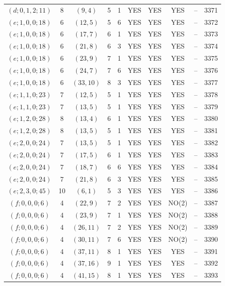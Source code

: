 \begin{longtable}{|c|c|c|c|c|c|c|c|c|c|}
$(d; 0, 1, 2; 11)$ & 8 & $(9, 4)$ & 5 & 1 & YES & YES & YES & -- & 3371\\
$(e; 1, 0, 0; 18)$ & 6 & $(12, 5)$ & 5 & 6 & YES & YES & YES & -- & 3372\\
$(e; 1, 0, 0; 18)$ & 6 & $(17, 7)$ & 6 & 1 & YES & YES & YES & -- & 3373\\
$(e; 1, 0, 0; 18)$ & 6 & $(21, 8)$ & 6 & 3 & YES & YES & YES & -- & 3374\\
$(e; 1, 0, 0; 18)$ & 6 & $(23, 9)$ & 7 & 1 & YES & YES & YES & -- & 3375\\
$(e; 1, 0, 0; 18)$ & 6 & $(24, 7)$ & 7 & 6 & YES & YES & YES & -- & 3376\\
$(e; 1, 0, 0; 18)$ & 6 & $(33, 10)$ & 8 & 3 & YES & YES & YES & -- & 3377\\
$(e; 1, 1, 0; 23)$ & 7 & $(12, 5)$ & 5 & 1 & YES & YES & YES & -- & 3378\\
$(e; 1, 1, 0; 23)$ & 7 & $(13, 5)$ & 5 & 1 & YES & YES & YES & -- & 3379\\
$(e; 1, 2, 0; 28)$ & 8 & $(13, 4)$ & 6 & 1 & YES & YES & YES & -- & 3380\\
$(e; 1, 2, 0; 28)$ & 8 & $(13, 5)$ & 5 & 1 & YES & YES & YES & -- & 3381\\
$(e; 2, 0, 0; 24)$ & 7 & $(13, 5)$ & 5 & 1 & YES & YES & YES & -- & 3382\\
$(e; 2, 0, 0; 24)$ & 7 & $(17, 5)$ & 6 & 1 & YES & YES & YES & -- & 3383\\
$(e; 2, 0, 0; 24)$ & 7 & $(18, 7)$ & 6 & 6 & YES & YES & YES & -- & 3384\\
$(e; 2, 0, 0; 24)$ & 7 & $(21, 8)$ & 6 & 3 & YES & YES & YES & -- & 3385\\
$(e; 2, 3, 0; 45)$ & 10 & $(6, 1)$ & 5 & 3 & YES & YES & YES & -- & 3386\\
$(f; 0, 0, 0; 6)$ & 4 & $(22, 9)$ & 7 & 2 & YES & YES & NO(2) & -- & 3387\\
$(f; 0, 0, 0; 6)$ & 4 & $(23, 9)$ & 7 & 1 & YES & YES & NO(2) & -- & 3388\\
$(f; 0, 0, 0; 6)$ & 4 & $(26, 11)$ & 7 & 2 & YES & YES & NO(2) & -- & 3389\\
$(f; 0, 0, 0; 6)$ & 4 & $(30, 11)$ & 7 & 6 & YES & YES & NO(2) & -- & 3390\\
$(f; 0, 0, 0; 6)$ & 4 & $(37, 11)$ & 8 & 1 & YES & YES & YES & -- & 3391\\
$(f; 0, 0, 0; 6)$ & 4 & $(37, 16)$ & 9 & 1 & YES & YES & YES & -- & 3392\\
$(f; 0, 0, 0; 6)$ & 4 & $(41, 15)$ & 8 & 1 & YES & YES & YES & -- & 3393\\

\end{longtable}
